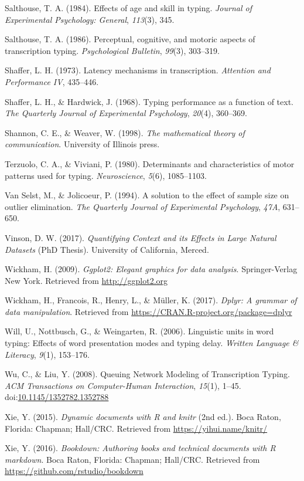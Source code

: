\documentclass[floatsintext,man]{apa6}
\theoremstyle{definition}
\theoremstyle{definition}
\theoremstyle{definition}
\theoremstyle{remark}
\begin{document}
\hypertarget{ref-salthouse_effects_1984}{}
Salthouse, T. A. (1984). Effects of age and skill in typing.
\emph{Journal of Experimental Psychology: General}, \emph{113}(3), 345.

\hypertarget{ref-salthouse_perceptual_1986}{}
Salthouse, T. A. (1986). Perceptual, cognitive, and motoric aspects of
transcription typing. \emph{Psychological Bulletin}, \emph{99}(3),
303--319.

\hypertarget{ref-shaffer_latency_1973}{}
Shaffer, L. H. (1973). Latency mechanisms in transcription.
\emph{Attention and Performance IV}, 435--446.

\hypertarget{ref-shaffer_typing_1968}{}
Shaffer, L. H., \& Hardwick, J. (1968). Typing performance as a function
of text. \emph{The Quarterly Journal of Experimental Psychology},
\emph{20}(4), 360--369.

\hypertarget{ref-Shannonmathematicaltheorycommunication1998}{}
Shannon, C. E., \& Weaver, W. (1998). \emph{The mathematical theory of
communication}. University of Illinois press.

\hypertarget{ref-terzuolo_determinants_1980}{}
Terzuolo, C. A., \& Viviani, P. (1980). Determinants and characteristics
of motor patterns used for typing. \emph{Neuroscience}, \emph{5}(6),
1085--1103.

\hypertarget{ref-van_selst_solution_1994}{}
Van Selst, M., \& Jolicoeur, P. (1994). A solution to the effect of
sample size on outlier elimination. \emph{The Quarterly Journal of
Experimental Psychology}, \emph{47A}, 631--650.

\hypertarget{ref-vinson_quantifying_2017}{}
Vinson, D. W. (2017). \emph{Quantifying Context and its Effects in Large
Natural Datasets} (PhD Thesis). University of California, Merced.

\hypertarget{ref-R-ggplot2}{}
Wickham, H. (2009). \emph{Ggplot2: Elegant graphics for data analysis}.
Springer-Verlag New York. Retrieved from \url{http://ggplot2.org}

\hypertarget{ref-R-dplyr}{}
Wickham, H., Francois, R., Henry, L., \& Müller, K. (2017). \emph{Dplyr:
A grammar of data manipulation}. Retrieved from
\url{https://CRAN.R-project.org/package=dplyr}

\hypertarget{ref-will_linguistic_2006}{}
Will, U., Nottbusch, G., \& Weingarten, R. (2006). Linguistic units in
word typing: Effects of word presentation modes and typing delay.
\emph{Written Language \& Literacy}, \emph{9}(1), 153--176.

\hypertarget{ref-wu_queuing_2008}{}
Wu, C., \& Liu, Y. (2008). Queuing Network Modeling of Transcription
Typing. \emph{ACM Transactions on Computer-Human Interaction},
\emph{15}(1), 1--45.
doi:\href{https://doi.org/10.1145/1352782.1352788}{10.1145/1352782.1352788}

\hypertarget{ref-R-knitr}{}
Xie, Y. (2015). \emph{Dynamic documents with R and knitr} (2nd ed.).
Boca Raton, Florida: Chapman; Hall/CRC. Retrieved from
\url{https://yihui.name/knitr/}

\hypertarget{ref-R-bookdown}{}
Xie, Y. (2016). \emph{Bookdown: Authoring books and technical documents
with R markdown}. Boca Raton, Florida: Chapman; Hall/CRC. Retrieved from
\url{https://github.com/rstudio/bookdown}

\endgroup
\end{document}
